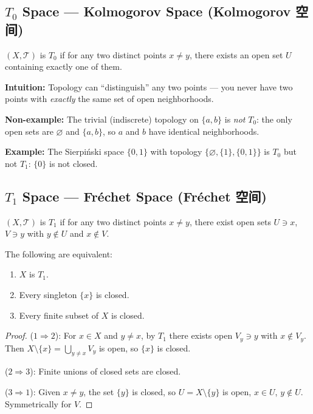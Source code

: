 \documentclass{article}
\begin{document}
\subsection{$T_0$ Space --- Kolmogorov Space (Kolmogorov 空间)}\label{def:T0}
\begin{definition}
  $(X, \mathcal{T})$ is $T_0$ if for any two distinct points $x \ne y$,
  there exists an open set $U$ containing exactly one of them.
\end{definition}

\textbf{Intuition:} Topology can ``distinguish'' any two points --- you
never have two points with \emph{exactly} the same set of open neighborhoods.

\textbf{Non-example:} The trivial (indiscrete) topology on $\{a, b\}$ is
\emph{not} $T_0$: the only open sets are $\varnothing$ and $\{a, b\}$,
so $a$ and $b$ have identical neighborhoods.

\textbf{Example:} The Sierpi\'nski space $\{0, 1\}$ with topology
$\{\varnothing, \{1\}, \{0,1\}\}$ is $T_0$ but not $T_1$: $\{0\}$ is not closed.

\subsection{$T_1$ Space --- Fr\'echet Space (Fr\'echet 空间)}\label{def:T1}
\begin{definition}
  $(X, \mathcal{T})$ is $T_1$ if for any two distinct points $x \ne y$,
  there exist open sets $U \ni x$, $V \ni y$ with $y \notin U$ and $x \notin V$.
\end{definition}

\begin{proposition}
  The following are equivalent:
  \begin{enumerate}
    \item $X$ is $T_1$.
    \item Every singleton $\{x\}$ is closed.
    \item Every finite subset of $X$ is closed.
  \end{enumerate}
\end{proposition}
\begin{proof}
  ($1 \Rightarrow 2$): For $x \in X$ and $y \ne x$, by $T_1$ there exists
  open $V_y \ni y$ with $x \notin V_y$. Then $X \setminus \{x\} =
  \bigcup_{y \ne x} V_y$ is open, so $\{x\}$ is closed.

  ($2 \Rightarrow 3$): Finite unions of closed sets are closed.

  ($3 \Rightarrow 1$): Given $x \ne y$, the set $\{y\}$ is closed, so
  $U = X \setminus \{y\}$ is open, $x \in U$, $y \notin U$.
  Symmetrically for $V$.
\end{proof}
\end{document}
